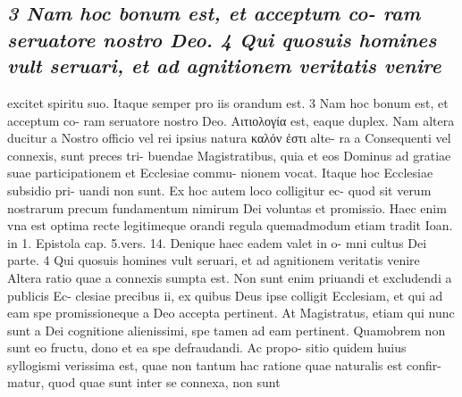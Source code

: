 \documentclass{article}
\begin{document}
\begin{pages}
\subsection*{\textit{3 Nam hoc bonum est, et acceptum co- ram seruatore nostro Deo. 4 Qui quosuis homines vult seruari, et ad agnitionem veritatis venire}}excitet spiritu suo. Itaque semper pro iis orandum est. 3 Nam hoc bonum est, et acceptum co- ram seruatore nostro Deo. Αιτιολογία est, eaque duplex. Nam altera ducitur a Nostro officio vel rei ipsius natura καλόν ἐστι alte- ra a Consequenti vel connexis, sunt preces tri- buendae Magistratibus, quia et eos Dominus ad gratiae suae participationem et Ecclesiae commu- nionem vocat. Itaque hoc Ecclesiae subsidio pri- uandi non sunt. Ex hoc autem loco colligitur ec- quod sit verum nostrarum precum fundamentum nimirum Dei voluntas et promissio. Haec enim vna est optima recte legitimeque orandi regula quemadmodum etiam tradit Ioan. in 1. Epistola cap. 5.vers. 14. Denique haec eadem valet in o- mni cultus Dei parte. 4 Qui quosuis homines vult seruari, et ad agnitionem veritatis venire Altera ratio quae a connexis sumpta est. Non sunt enim priuandi et excludendi a publicis Ec- clesiae precibus ii, ex quibus Deus ipse colligit Ecclesiam, et qui ad eam spe promissioneque a Deo accepta pertinent. At Magistratus, etiam qui nunc sunt a Dei cognitione alienissimi, spe tamen ad eam pertinent. Quamobrem non sunt eo fructu, dono et ea spe defraudandi. Ac propo- sitio quidem huius syllogismi verissima est, quae non tantum hac ratione quae naturalis est confir- matur, quod quae sunt inter se connexa, non sunt  \pend

\end{pages}
\end{document}
